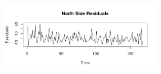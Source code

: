 \documentclass{article} %
\begin{document}
\begin{center}
\begin{figure}[H]
\includegraphics[height=50mm, width=80mm]{Plots/north_residuals.png}
\end{figure}
\end{center}
 

 
\end{document}
